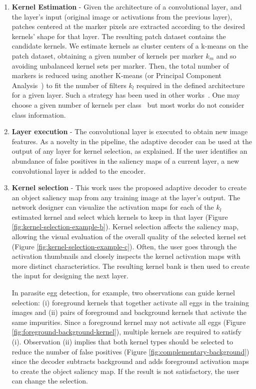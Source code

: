 \documentclass[10pt,twocolumn,twoside]{IEEEtran}
\begin{document}
\begin{enumerate}
  \item \textbf{Kernel Estimation} - Given the architecture of a convolutional layer, and the layer's input (original image or activations from the previous layer), patches centered at the marker pixels are extracted according to the desired kernels' shape for that layer. The resulting patch dataset contains the candidate kernels. We estimate kernels as cluster centers of a k-means on the patch dataset, obtaining a given number of kernels per marker $k_m$ and so avoiding unbalanced kernel sets per marker.  Then, the total number of markers is reduced using another K-means (or Principal Component Analysis~\cite{sousa2021cnn}) to fit the number of filters $k_l$ required in the defined architecture for a given layer. Such a strategy has been used in other works~\cite{cerqueira2023building}. One may choose a given number of kernels per class~\cite{de2020learning} but most works do not consider class information.

  \item \textbf{Layer execution} - The convolutional layer is executed to obtain new image features. As a novelty in the pipeline, the adaptive decoder can be used at the output of any layer for kernel selection, as explained. If the user identifies an abundance of false positives in the saliency maps of a current layer, a new convolutional layer is added to the encoder.
  
  \item \textbf{Kernel selection} - This work uses the proposed adaptive decoder to create an object saliency map from any training image at the layer's output. The network designer can visualize the activation maps for each of the $k_l$ estimated kernel and select which kernels to keep in that layer (Figure \ref{fig:kernel-selection-example-b}). Kernel selection affects the saliency map, allowing the visual evaluation of the overall quality of the selected kernel set (Figure \ref{fig:kernel-selection-example-c}). Often, the user goes through the activation thumbnails and closely inspects the kernel activation maps with more distinct characteristics. The resulting kernel bank is then used to create the input for designing the next layer.

In parasite egg detection, for example, two observations can guide kernel selection: (i) foreground kernels that together activate all eggs in the training images and (ii) pairs of foreground and background kernels that activate the same impurities. Since a foreground kernel may not activate all eggs (Figure \ref{fig:foreground-background-kernel}), multiple kernels are required to satisfy (i). Observation (ii) implies that both kernel types should be selected to reduce the number of false positives (Figure \ref{fig:complementary-background}) since the decoder subtracts background and adds foreground activation maps to create the object saliency map. If the result is not satisfactory, the user can change the selection.  


\end{enumerate}
\end{document}

